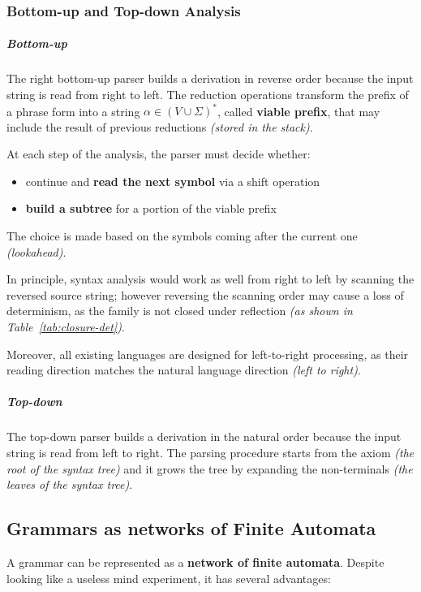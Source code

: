 \documentclass[english]{article}
\begin{document}
\subsubsection{Bottom-up and Top-down Analysis}

\subparagraph*{Bottom-up}

The right bottom-up parser builds a derivation in reverse order because the input string is read from right to left.
The reduction operations transform the prefix of a phrase form into a string \(\alpha \in \left( V \cup \Sigma \right)^\ast\), called \textbf{viable prefix}, that may include the result of previous reductions \textit{(stored in the stack)}.

At each step of the analysis, the parser must decide whether:

\begin{itemize}
  \item continue and \textbf{read the next symbol} via a shift operation
  \item \textbf{build a subtree} for a portion of the viable prefix
\end{itemize}

The choice is made based on the symbols coming after the current one \textit{(lookahead)}.

\bigskip
In principle, syntax analysis would work as well from right to left by scanning the reversed source string;
however reversing the scanning order may cause a loss of determinism, as the \DET family is not closed under reflection \textit{(as shown in Table~\ref{tab:closure-det})}.

Moreover, all existing languages are designed for left-to-right processing, as their reading direction matches the natural language direction \textit{(left to right)}.

\subparagraph*{Top-down}

The top-down parser builds a derivation in the natural order because the input string is read from left to right.
The parsing procedure starts from the axiom \textit{(the root of the syntax tree)} and it grows the tree by expanding the non-terminals \textit{(the leaves of the syntax tree)}.

\subsection{Grammars as networks of Finite Automata}

A grammar can be represented as a \textbf{network of finite automata}.
Despite looking like a useless mind experiment, it has several advantages:
\end{document}
